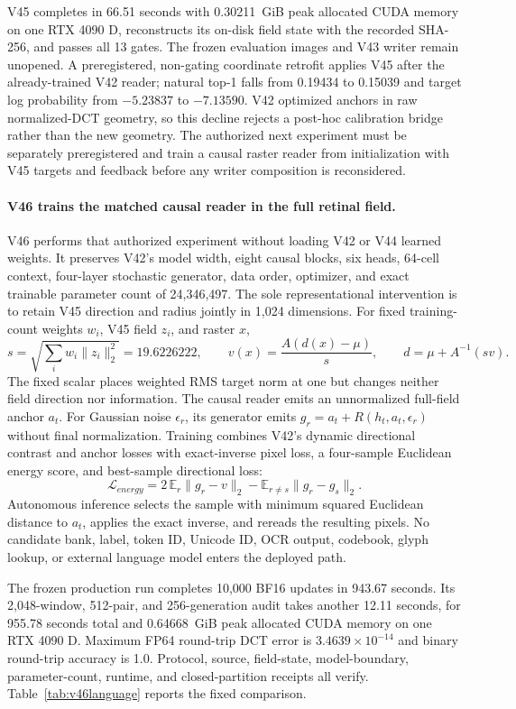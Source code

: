 \documentclass[11pt]{article}
\begin{document}
V45 completes in 66.51 seconds with 0.30211~GiB peak allocated CUDA memory on
one RTX 4090 D, reconstructs its on-disk field state with the recorded SHA-256,
and passes all 13 gates. The frozen evaluation images and V43 writer remain
unopened. A preregistered, non-gating coordinate retrofit applies V45 after the
already-trained V42 reader; natural top-1 falls from 0.19434 to 0.15039 and
target log probability from $-5.23837$ to $-7.13590$. V42 optimized anchors in
raw normalized-DCT geometry, so this decline rejects a post-hoc calibration
bridge rather than the new geometry. The authorized next experiment must be
separately preregistered and train a causal raster reader from initialization
with V45 targets and feedback before any writer composition is reconsidered.

\paragraph{V46 trains the matched causal reader in the full retinal field.}
V46 performs that authorized experiment without loading V42 or V44 learned
weights. It preserves V42's model width, eight causal blocks, six heads,
64-cell context, four-layer stochastic generator, data order, optimizer, and
exact trainable parameter count of 24,346,497. The sole representational
intervention is to retain V45 direction and radius jointly in 1,024 dimensions.
For fixed training-count weights $w_i$, V45 field $z_i$, and raster $x$,
\[
s=\sqrt{\sum_i w_i\lVert z_i\rVert_2^2}=19.6226222,\qquad
v(x)=\frac{A(d(x)-\mu)}{s},\qquad
d=\mu+A^{-1}(sv).
\]
The fixed scalar places weighted RMS target norm at one but changes neither
field direction nor information. The causal reader emits an unnormalized
full-field anchor $a_t$. For Gaussian noise $\epsilon_r$, its generator emits
$g_r=a_t+R(h_t,a_t,\epsilon_r)$ without final normalization. Training combines
V42's dynamic directional contrast and anchor losses with exact-inverse pixel
loss, a four-sample Euclidean energy score, and best-sample directional loss:
\[
\mathcal L_{energy}=2\,\mathbb E_r\lVert g_r-v\rVert_2
-\mathbb E_{r\ne s}\lVert g_r-g_s\rVert_2.
\]
Autonomous inference selects the sample with minimum squared Euclidean distance
to $a_t$, applies the exact inverse, and rereads the resulting pixels. No
candidate bank, label, token ID, Unicode ID, OCR output, codebook, glyph lookup,
or external language model enters the deployed path.

The frozen production run completes 10,000 BF16 updates in 943.67 seconds. Its
2,048-window, 512-pair, and 256-generation audit takes another 12.11 seconds,
for 955.78 seconds total and 0.64668~GiB peak allocated CUDA memory on one RTX
4090 D. Maximum FP64 round-trip DCT error is
$3.4639\times10^{-14}$ and binary round-trip accuracy is 1.0. Protocol, source,
field-state, model-boundary, parameter-count, runtime, and closed-partition
receipts all verify. Table~\ref{tab:v46language} reports the fixed comparison.
\end{document}
